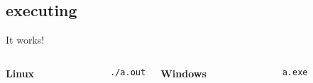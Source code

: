 \subsection{executing}
\begin{frame}[fragile]{It works!}
	\begin{columns}[T]
		\textbf{Linux}\\
		\begin{lstlisting}
			./a.out
		\end{lstlisting}
		\textbf{Windows}\\
		\begin{lstlisting}
			a.exe
		\end{lstlisting}
	\end{columns}
\end{frame}


